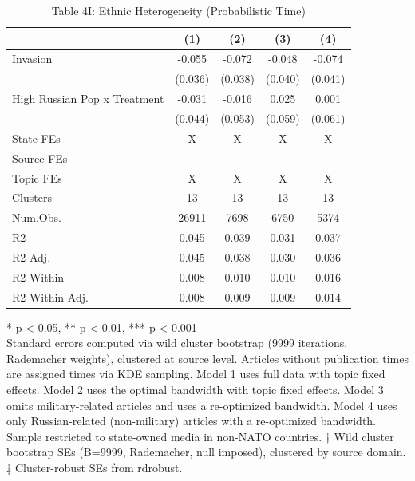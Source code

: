 \begin{table}[!t]
\caption{Table 4I: Ethnic Heterogeneity (Probabilistic Time)} 
\fontsize{12.0pt}{14.4pt}\selectfont
\begin{tabular*}{\linewidth}{@{\extracolsep{\fill}}lcccc}
\toprule
  & (1) & (2) & (3) & (4) \\ 
\midrule\addlinespace[2.5pt]
Invasion & -0.055 & -0.072 & -0.048 & -0.074 \\ 
 & (0.036) & (0.038) & (0.040) & (0.041) \\ 
High Russian Pop x Treatment & -0.031 & -0.016 & 0.025 & 0.001 \\ 
{} & {(0.044)} & {(0.053)} & {(0.059)} & {(0.061)} \\ 
State FEs & X & X & X & X \\ 
Source FEs & - & - & - & - \\ 
Topic FEs & X & X & X & X \\ 
Clusters & 13 & 13 & 13 & 13 \\ 
Num.Obs. & 26911 & 7698 & 6750 & 5374 \\ 
R2 & 0.045 & 0.039 & 0.031 & 0.037 \\ 
R2 Adj. & 0.045 & 0.038 & 0.030 & 0.036 \\ 
R2 Within & 0.008 & 0.010 & 0.010 & 0.016 \\ 
R2 Within Adj. & 0.008 & 0.009 & 0.009 & 0.014 \\ 
\bottomrule
\end{tabular*}
\begin{minipage}{\linewidth}
* p < 0.05, ** p < 0.01, *** p < 0.001\\
Standard errors computed via wild cluster bootstrap (9999 iterations, Rademacher
weights), clustered at source level. Articles without publication times are
assigned times via KDE sampling. Model 1 uses full data with topic fixed
effects. Model 2 uses the optimal bandwidth with topic fixed effects. Model 3
omits military-related articles and uses a re-optimized bandwidth. Model 4 uses
only Russian-related (non-military) articles with a re-optimized bandwidth.
Sample restricted to state-owned media in non-NATO countries. † Wild cluster
bootstrap SEs (B=9999, Rademacher, null imposed), clustered by source domain. ‡
Cluster-robust SEs from rdrobust.\\
\end{minipage}
\end{table}

